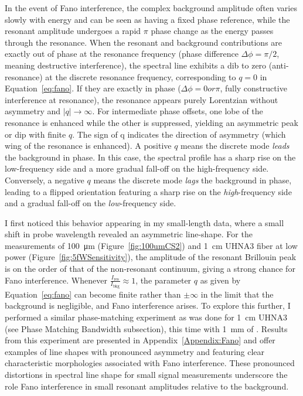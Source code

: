 In the event of Fano interference, the complex background amplitude often varies slowly with energy and can be seen as having a fixed phase reference, while the resonant amplitude undergoes a rapid \(\pi\) phase change as the energy passes through the resonance. \cite{limonov2017fano} When the resonant and background contributions are exactly out of phase at the resonance frequency (phase difference \(\Delta\phi = \pi/2\), meaning destructive interference), the spectral line exhibits a dib to zero (anti-resonance) at the discrete resonance frequency, corresponding to \(q=0\) in Equation~\ref{eq:fano}. If they are exactly in phase (\(\Delta\phi = 0 or \pi\), fully constructive interference at resonance), the resonance appears purely Lorentzian without asymmetry and \(|q| \to \infty\). For intermediate phase offsets, one lobe of the resonance is enhanced while the other is suppressed, yielding an asymmetric peak or dip with finite \(q\). The sign of q indicates the direction of asymmetry (which wing of the resonance is enhanced). A positive \(q\) means the discrete mode \textit{leads} the background in phase. In this case, the spectral profile has a sharp rise on the low-frequency side and a more gradual fall-off on the high-frequency side. Conversely, a negative \(q\) means the discrete mode \textit{lags} the background in phase, leading to a flipped orientation featuring a sharp rise on the \textit{high}-frequency side and a gradual fall-off on the \textit{low}-frequency side.

I first noticed this behavior appearing in my small-length  data, where a small shift in probe wavelength revealed an asymmetric line-shape. For the measurements of \SI{100}{\micro\meter}  (Figure~\ref{fig:100umCS2}) and \SI{1}{\centi\meter} UHNA3 fiber at low power (Figure~\ref{fig:5fWSensitivity}), the amplitude of the resonant Brillouin peak is on the order of that of the non‐resonant continuum, giving a strong chance for Fano interference. Whenever \(\tfrac{I_{\text{res}}}{I_{\text{bkg}}}\approx 1\), the parameter \(q\) as given by Equation~\ref{eq:fano} can become finite rather than \(\pm \infty\) in the limit that the background is negligible, and Fano interference arises. To explore this further, I performed a similar phase-matching experiment as was done for \SI{1}{\centi\meter} UHNA3 (see Phase Matching Bandwidth subsection), this time with \SI{1}{\milli\meter} of . Results from this experiment are presented in Appendix~\ref{Appendix:Fano} and offer examples of line shapes with pronounced asymmetry and featuring clear characteristic morphologies associated with Fano interference. These pronounced distortions in spectral line shape for small signal measurements underscore the role Fano interference in small resonant amplitudes relative to the background.

